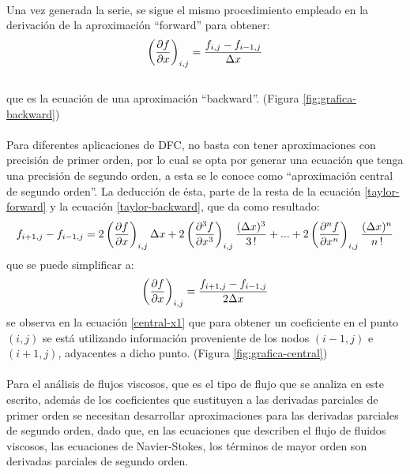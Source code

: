 \documentclass[letterpaper, openright, 12pt]{book}
\begin{document}
	\paragraph{}
	Una vez generada la serie, se sigue el mismo procedimiento empleado en la derivación de la aproximación ``forward'' para obtener:
	\begin{equation}
	\left( \pdv{f}{x} \right)_{i,j} = \frac{f_{i,j} - f_{i-1,j}}{\Delta x}
	\label{backward-x1}
	\end{equation}
	\\que es la ecuación de una aproximación ``backward''. (Figura \ref{fig:grafica-backward})
	
	\paragraph*{}
	Para diferentes aplicaciones de DFC, no basta con tener aproximaciones con precisión de primer orden, por lo cual se opta por generar una ecuación que tenga una precisión de segundo orden, a esta se le conoce como ``aproximación central de segundo orden''. La deducción de ésta, parte de la resta de la ecuación \ref{taylor-forward} y la ecuación \ref{taylor-backward}, que da como resultado:
	\begin{equation}
	f_{i+1,j} - f_{i-1, j} = 2 \left( \pdv{f}{x} \right)_{i,j} \Delta x + 2 \left( \pdv[3]{f}{x} \right)_{i,j} \frac{(\Delta x)^3}{3 \,!} + ... + 2 \left( \pdv[n]{f}{x} \right)_{i,j} \frac{(\Delta x)^n}{n\,!}
	\end{equation}
	que se puede simplificar a:\\
	\begin{equation}
	\left( \pdv{f}{x} \right)_{i,j} = \frac{f_{i+1,j} - f_{i-1,j}}{2 \Delta x}
	\label{central-x1}
	\end{equation}
	se observa en la ecuación \ref{central-x1} que para obtener un coeficiente en el punto $(i,j)$ se está utilizando información proveniente de los nodos $(i-1, j)$ e $(i+1, j)$, adyacentes a dicho punto. (Figura \ref{fig:grafica-central})
	
	\paragraph*{}
	Para el análisis de flujos viscosos, que es el tipo de flujo que se analiza en este escrito, además de los coeficientes que sustituyen a las derivadas parciales de primer orden se necesitan desarrollar aproximaciones para las derivadas parciales de segundo orden, dado que, en las ecuaciones que describen el flujo de fluidos viscosos, las ecuaciones de Navier-Stokes, los términos de mayor orden son derivadas parciales de segundo orden.
	
\end{document}

